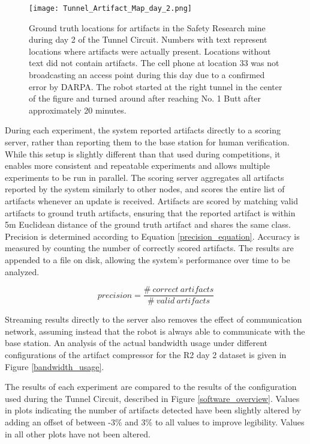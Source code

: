 \begin{figure}	
	\centering
	\texttt{[image: Tunnel\_Artifact\_Map\_day\_2.png]}
	\caption[Tunnel Circuit day 2 artifact locations]{Ground truth locations for artifacts in the Safety Research mine during day 2 of the Tunnel Circuit. Numbers with text represent locations where artifacts were actually present. Locations without text did not contain artifacts. The cell phone at location 33 was not broadcasting an access point during this day due to a confirmed error by DARPA. The robot started at the right tunnel in the center of the figure and turned around after reaching No. 1 Butt after approximately 20 minutes.}
	\label{tunnel_circuit_day_2}
\end{figure}

During each experiment, the system reported artifacts directly to a scoring server, rather than reporting them to the base station for human verification. While this setup is slightly different than that used during competitions, it enables more consistent and repeatable experiments and allows multiple experiments to be run in parallel. The scoring server aggregates all artifacts reported by the system similarly to other nodes, and scores the entire list of artifacts whenever an update is received. Artifacts are scored by matching valid artifacts to ground truth artifacts, ensuring that the reported artifact is within 5m Euclidean distance of the ground truth artifact and shares the same class. Precision is determined according to Equation \ref{precision_equation}. Accuracy is measured by counting the number of correctly scored artifacts. The results are appended to a file on disk, allowing the system's performance over time to be analyzed.

\begin{equation} \label{precision_equation}
precision = \frac{\#\ correct\ artifacts}{\#\ valid\ artifacts}
\end{equation}

Streaming results directly to the server also removes the effect of communication network, assuming instead that the robot is always able to communicate with the base station. An analysis of the actual bandwidth usage under different configurations of the artifact compressor for the R2 day 2 dataset is given in Figure \ref{bandwidth_usage}. 

The results of each experiment are compared to the results of the configuration used during the Tunnel Circuit, described in Figure \ref{software_overview}. Values in plots indicating the number of artifacts detected have been slightly altered by adding an offset of between -3\% and 3\% to all values to improve legibility. Values in all other plots have not been altered.

